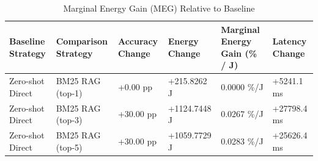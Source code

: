 \begin{table}
\caption{Marginal Energy Gain (MEG) Relative to Baseline}
\label{tab:marginal_energy_gain}
\begin{tabular}{llllll}
\toprule
Baseline Strategy & Comparison Strategy & Accuracy Change & Energy Change & Marginal Energy Gain (\% / J) & Latency Change \\
\midrule
Zero-shot Direct & BM25 RAG (top-1) & +0.00 pp & +215.8262 J & 0.0000 \%/J & +5241.1 ms \\
Zero-shot Direct & BM25 RAG (top-3) & +30.00 pp & +1124.7448 J & 0.0267 \%/J & +27798.4 ms \\
Zero-shot Direct & BM25 RAG (top-5) & +30.00 pp & +1059.7729 J & 0.0283 \%/J & +25626.4 ms \\
\bottomrule
\end{tabular}
\end{table}
